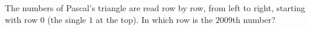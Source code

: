 The numbers of Pascal's triangle are read row by row, from left to right, starting with row $0$ (the single $1$ at the top). In which row is the $2009$th number?
